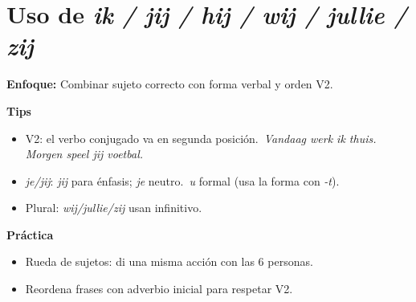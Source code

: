 \section{Uso de \textit{ik / jij / hij / wij / jullie / zij}}
\textbf{Enfoque:} Combinar sujeto correcto con forma verbal y orden V2.

\textbf{Tips}
\begin{itemize}[leftmargin=*]
  \item V2: el verbo conjugado va en segunda posición.\ \textit{Vandaag werk ik thuis. Morgen speel jij voetbal.}
  \item \textit{je/jij}: \textit{jij} para énfasis; \textit{je} neutro.\ \textit{u} formal (usa la forma con \textit{-t}).
  \item Plural: \textit{wij/jullie/zij} usan infinitivo.
\end{itemize}

\textbf{Práctica}
\begin{itemize}[leftmargin=*]
  \item Rueda de sujetos: di una misma acción con las 6 personas.
  \item Reordena frases con adverbio inicial para respetar V2.
\end{itemize}
